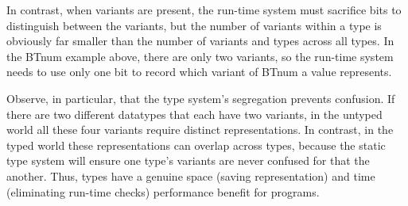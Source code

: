 In contrast, when variants are present, the run-time system must sacrifice bits
to distinguish between the variants, but the number of variants within a type is
obviously far smaller than the number of variants and types across all types. In
the BTnum example above, there are only two variants, so the run-time system
needs to use only one bit to record which variant of BTnum a value represents.

Observe, in particular, that the type system’s segregation prevents confusion.
If there are two different datatypes that each have two variants, in the untyped
world all these four variants require distinct representations. In contrast, in
the typed world these representations can overlap across types, because the
static type system will ensure one type’s variants are never confused for that
the another. Thus, types have a genuine space (saving representation) and time
(eliminating run-time checks) performance benefit for programs.
